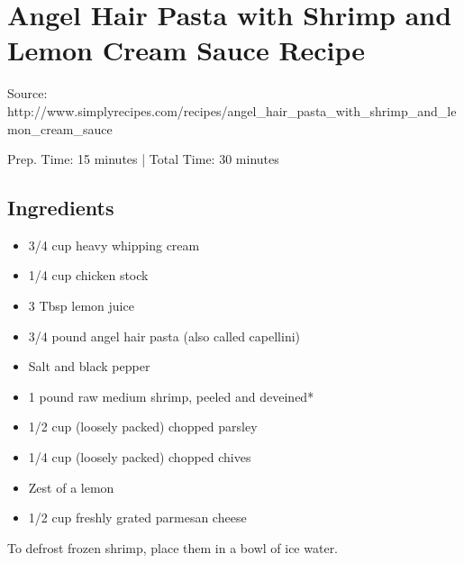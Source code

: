 \section{Angel Hair Pasta with Shrimp and Lemon Cream Sauce Recipe}

Source: http://www.simplyrecipes.com/recipes/angel\_hair\_pasta\_with\_shrimp\_and\_lemon\_cream\_sauce

\begin{center}
Prep. Time: 15 minutes |
Total Time: 30 minutes
\end{center}

\subsection{Ingredients}
\begin{multicols}{2}
\begin{itemize}
    \item 3/4 cup heavy whipping cream
    \item 1/4 cup chicken stock
    \item 3 Tbsp lemon juice
    \item 3/4 pound angel hair pasta (also called capellini)
    \item Salt and black pepper
    \item 1 pound raw medium shrimp, peeled and deveined*
    \item 1/2 cup (loosely packed) chopped parsley
    \item 1/4 cup (loosely packed) chopped chives
    \item Zest of a lemon
    \item 1/2 cup freshly grated parmesan cheese
\end{itemize}
\end{multicols}

\vspace{1em}

\noindent *To defrost frozen shrimp, place them in a bowl of ice water.

